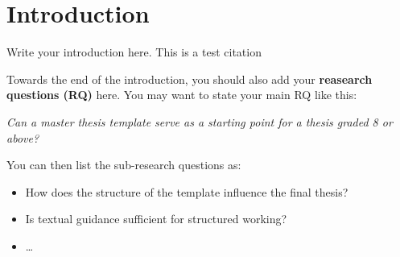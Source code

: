 \section{Introduction}
\label{sec:introduction}
Write your introduction here. This is a test citation \cite{Gruber1995}

Towards the end of the introduction, you should also add your \textbf{reasearch questions (RQ)} here. You may want to state your main RQ like this:

\noindent\textit{Can a master thesis template serve as a starting point for a thesis graded 8 or above?}

You can then list the sub-research questions as:
\begin{itemize}
    \item How does the structure of the template influence the final thesis?
    \item Is textual guidance sufficient for structured working?
    \item \dots
\end{itemize}
